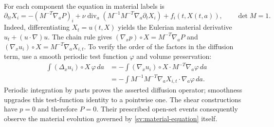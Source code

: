 For each component the equation in material labels is
\begin{equation}\label{sv:material-equation}
 \partial_{tt}X_i=-(M^{-T}\nabla_aP)_i
 +\nu\operatorname{div}_a
       (M^{-1}M^{-T}\nabla_a\partial_tX_i)
 +f_i(t,X(t,a)),\qquad \det M=1.
\end{equation}
Indeed, differentiating $X_t=u(t,X)$ yields the Eulerian material
derivative $u_t+(u\cdot\nabla)u$.  The chain rule gives
$(\nabla_xp)\circ X=M^{-T}\nabla_aP$ and
$(\nabla_xu_i)\circ X=M^{-T}\nabla_aX_{i,t}$.
To verify the order of the factors in the diffusion term, use a smooth
periodic test function $\varphi$ and volume preservation:
\begin{align*}
 \int(\Delta_xu_i)\circ X\,\varphi\,da
 &=-\int (\nabla_xu_i)\circ X\cdot M^{-T}\nabla_a\varphi\,da\\
 &=-\int M^{-1}M^{-T}\nabla_aX_{i,t}\cdot\nabla_a\varphi\,da.
\end{align*}
Periodic integration by parts proves the asserted diffusion operator;
smoothness upgrades this test-function identity to a pointwise one.
The shear constructions have $p=0$ and therefore $P=0$.
Their prescribed open-set events consequently observe the material
evolution governed by \eqref{sv:material-equation} itself.
